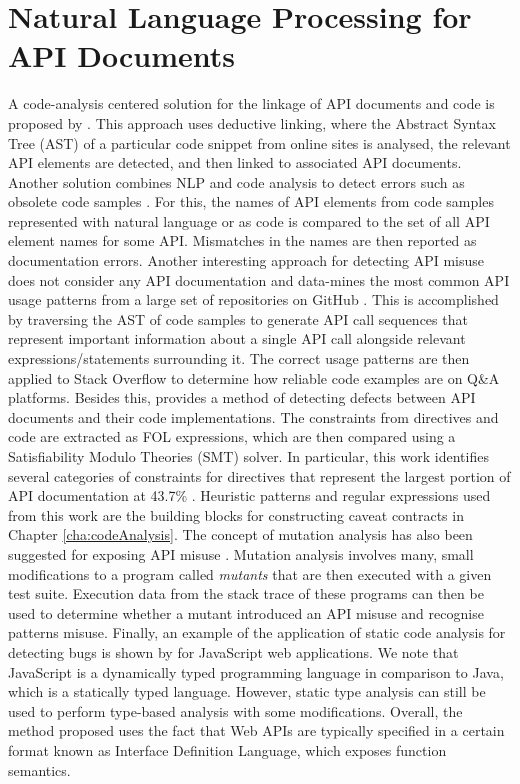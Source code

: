 \section{Natural Language Processing for API Documents}
\label{sec:related-nlp}
A code-analysis centered solution for the linkage of API documents and code is proposed by \cite{live-api-doc}. This approach uses deductive linking, where the Abstract Syntax Tree (AST) of a particular code snippet from online sites is analysed, the relevant API elements are detected, and then linked to associated API documents. Another solution combines NLP and code analysis to detect errors such as obsolete code samples \cite{zhong2013detecting}. For this, the names of API elements from code samples represented with natural language or as code is compared to the set of all API element names for some API. Mismatches in the names are then reported as documentation errors. Another interesting approach for detecting API misuse does not consider any API documentation and data-mines the most common API usage patterns from a large set of repositories on GitHub \cite{code-examples}. This is accomplished by traversing the AST of code samples to generate API call sequences that represent important information about a single API call alongside relevant expressions/statements surrounding it. The correct usage patterns are then applied to Stack Overflow to determine how reliable code examples are on Q\&A platforms. Besides this, \cite{zhou-directive} provides a method of detecting defects between API documents and their code implementations.  The constraints from directives and code are extracted as FOL expressions, which are then compared using a Satisfiability Modulo Theories (SMT) solver. In particular, this work identifies several categories of constraints for directives that represent the largest portion of API documentation at 43.7\% \cite{monperrus2012should}. Heuristic patterns and regular expressions used from this work are the building blocks for constructing caveat contracts in Chapter \ref{cha:codeAnalysis}.
The concept of mutation analysis has also been suggested for exposing API misuse \cite{mutation-analysis}. Mutation analysis involves many, small modifications to a program called \textit{mutants} that are then executed with a given test suite. Execution data from the stack trace of these programs can then be used to determine whether a mutant introduced an API misuse and recognise patterns misuse. Finally, an example of the application of static code analysis for detecting bugs is shown by \cite{bae2014safewapi} for JavaScript web applications. We note that JavaScript is a dynamically typed programming language in comparison to Java, which is a statically typed language. However, static type analysis can still be used to perform type-based analysis with some modifications. Overall, the method proposed uses the fact that Web APIs are typically specified in a certain format known as Interface Definition Language, which exposes function semantics.

